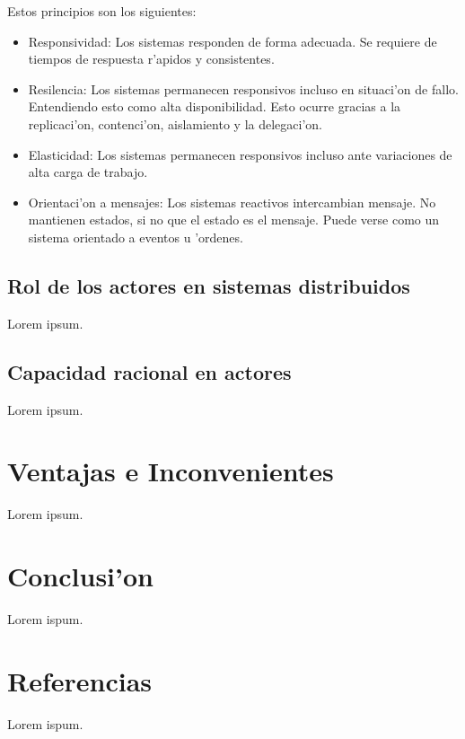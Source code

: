 \documentclass[12pt]{article}
\begin{document}
Estos principios son los siguientes:

\begin{itemize}
	\item Responsividad: Los sistemas responden de forma adecuada. Se requiere de tiempos
    de respuesta r'apidos y consistentes.
	\item Resilencia: Los sistemas permanecen responsivos incluso en situaci'on de fallo.
    Entendiendo esto como alta disponibilidad. Esto ocurre gracias a la replicaci'on, contenci'on,
    aislamiento y la delegaci'on.
	\item Elasticidad: Los sistemas permanecen responsivos incluso ante variaciones de alta
    carga de trabajo.
	\item Orientaci'on a mensajes: Los sistemas reactivos intercambian mensaje. No mantienen estados,
    si no que el estado es el mensaje. Puede verse como un sistema orientado a eventos u 'ordenes.
\end{itemize}

\subsection{Rol de los actores en sistemas distribuidos}
\label{sub:rol de los actores en sistemas distribuidos}
Lorem ipsum.
\subsection{Capacidad racional en actores}
\label{sub:capacidad racional en actores}
Lorem ipsum.
\section{Ventajas e Inconvenientes}
\label{sec:ventajas e inconvenientes}
Lorem ipsum.
\section{Conclusi'on}
Lorem ispum.
\section{Referencias}
Lorem ispum.
\end{document}
